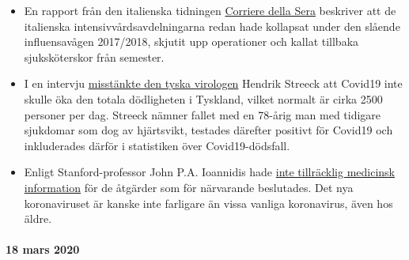 \begin{itemize}
\tightlist
\item
  En rapport från den italienska tidningen
  \href{https://milano.corriere.it/notizie/cronaca/18_gennaio_10/milano-terapie-intensive-collasso-l-influenza-gia-48-malati-gravi-molte-operazioni-rinviate-c9dc43a6-f5d1-11e7-9b06-fe054c3be5b2.shtml}{Corriere
  della Sera} beskriver att de italienska intensivvårdsavdelningarna
  redan hade kollapsat under den slående influensavågen 2017/2018,
  skjutit upp operationer och kallat tillbaka sjuksköterskor från
  semester.
\item
  I en intervju
  \href{https://www.faz.net/aktuell/gesellschaft/gesundheit/coronavirus/virologe-hendrik-streeck-ueber-corona-neue-symptome-entdeckt-16681450.html?printPagedArticle=true\#pageIndex_2}{misstänkte
  den tyska virologen} Hendrik Streeck att Covid19 inte skulle öka den
  totala dödligheten i Tyskland, vilket normalt är cirka 2500 personer
  per dag. Streeck nämner fallet med en 78-årig man med tidigare
  sjukdomar som dog av hjärtsvikt, testades därefter positivt för
  Covid19 och inkluderades därför i statistiken över Covid19-dödsfall.
\item
  Enligt Stanford-professor John P.A. Ioannidis hade
  \href{https://www.statnews.com/2020/03/17/a-fiasco-in-the-making-as-the-coronavirus-pandemic-takes-hold-we-are-making-decisions-without-reliable-data/}{inte
  tillräcklig medicinsk information} för de åtgärder som för närvarande
  beslutades. Det nya koronaviruset är kanske inte farligare än vissa
  vanliga koronavirus, även hos äldre.
\end{itemize}

\hypertarget{18-mars-2020}{%
\paragraph{18 mars 2020}\label{18-mars-2020}}

